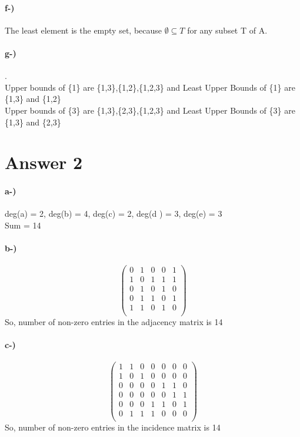 \documentclass[12pt]{article}
\begin{document}
\paragraph{f-)}
The least element is the empty set, because $\emptyset \subseteq T$ for any subset T of A.
\paragraph{g-)}.\\
Upper bounds of \{1\} are \{1,3\},\{1,2\},\{1,2,3\} and Least Upper Bounds of \{1\} are \{1,3\} and \{1,2\} \\
Upper bounds of \{3\} are \{1,3\},\{2,3\},\{1,2,3\} and Least Upper Bounds of \{3\} are \{1,3\} and \{2,3\}
\section*{Answer 2}
\paragraph{a-)}
deg(a) = 2, deg(b) = 4, deg(c) = 2, deg(d ) = 3, deg(e) = 3 \\
Sum = 14
\paragraph{b-)}
\[
    \begin{pmatrix}
        0 & 1 & 0 & 0 & 1 \\
        1 & 0 & 1 & 1 & 1 \\
        0 & 1 & 0 & 1 & 0 \\
        0 & 1 & 1 & 0 & 1 \\
        1 & 1 & 0 & 1 & 0 \\
    \end{pmatrix}
\]
So, number of non-zero entries in the adjacency matrix is 14
\paragraph{c-)}
\[
    \begin{pmatrix}
        1 & 1 & 0 & 0 & 0 & 0 & 0 \\
        1 & 0 & 1 & 0 & 0 & 0 & 0 \\
        0 & 0 & 0 & 0 & 1 & 1 & 0 \\
        0 & 0 & 0 & 0 & 0 & 1 & 1 \\
        0 & 0 & 0 & 1 & 1 & 0 & 1 \\
        0 & 1 & 1 & 1 & 0 & 0 & 0 \\
    \end{pmatrix}
\]
So, number of non-zero entries in the incidence matrix is 14
\end{document}
